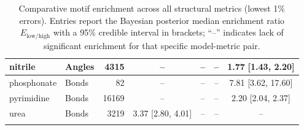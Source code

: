\begin{longtable}[c]{ ll | r | c c c c}
    \hline
    nitrile & Angles & 4315 & -- & -- & -- & 1.77\,\,[1.43, 2.20] \\
    \hline
    phosphonate & Bonds & 82 & -- & -- & -- & 7.81\,\,[3.62, 17.60] \\
    \hline
    pyrimidine & Bonds & 16169 & -- & -- & -- & 2.20\,\,[2.04, 2.37] \\
    \hline
    urea & Bonds & 3219 & 3.37\,\,[2.80, 4.01] & -- & -- & -- \\
    \hline
    \hline
    \caption{Comparative motif enrichment across all structural metrics (lowest 1\% errors). Entries report the Bayesian posterior median enrichment ratio $E_{\mathrm{low/high}}$ with a 95\% credible interval in brackets; ``--'' indicates lack of significant enrichment for that specific model-metric pair.}
    \label{tab:agglutinated_best}
\end{longtable}
\endgroup